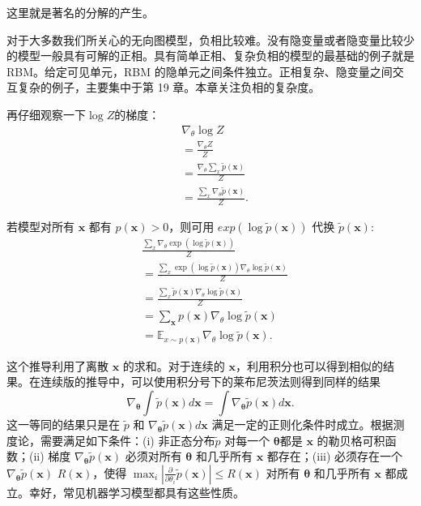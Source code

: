 这里就是著名的分解的产生。

对于大多数我们所关心的无向图模型，负相比较难。没有隐变量或者隐变量比较少的模型一般具有可解的正相。具有简单正相、复杂负相的模型的最基础的例子就是 RBM。给定可见单元，RBM 的隐单元之间条件独立。正相复杂、隐变量之间交互复杂的例子，主要集中于第 19 章。本章关注负相的复杂度。

再仔细观察一下\(\log Z\)的梯度：
\begin{align}
    & \nabla_\theta \log{Z}                                \\
    & = \frac{\nabla_\theta Z}{Z}                          \\
    & = \frac{\nabla_\theta\sum_x\widetilde{p}(\bm{x})}{Z} \\
    & = \frac{\sum_x\nabla_\theta\widetilde{p}(\bm{x})}{Z}.
\end{align}

若模型对所有 \(\bm{x}\) 都有 \(p(\bm{x})>0\)，则可用 \(exp(\log\widetilde{p}(\bm{x}))\) 代换 \(\widetilde{p}(\bm{x})\):
\begin{align}
& \frac{\sum_x\nabla_\theta\exp(
	\log{\widetilde{p}(\bm{x})})}{Z}             \\
& = \frac{\sum_x\exp(\log{\widetilde{p}(\bm{x})})
	\nabla_\theta\log{\widetilde{p}(\bm{x})}}{Z} \\
& = \frac{\sum_x\widetilde{p}(\bm{x})
	\nabla_\theta\log\widetilde{p}(\bm{x})}{Z}   \\
& = \sum_{\bm{x}}p(\bm{x})
	\nabla_\theta\log\widetilde{p}(\bm{x})       \\
& = \mathbb{E}_{x\sim{}p(\bm{x})}
	\nabla_\theta\log\widetilde{p}(\bm{x}).
\end{align}

这个推导利用了离散 \(\bm{x}\) 的求和。对于连续的 \(\bm{x}\)，利用积分也可以得到相似的结果。在连续版的推导中，可以使用积分号下的莱布尼茨法则得到同样的结果
\begin{equation}
    \nabla_{\bm{\theta}}\int\widetilde{p}(\bm{x})d\bm{x}
    = \int\nabla_{\bm\theta}\widetilde{p}(\bm{x})d\bm{x}.
\end{equation}
这一等同的结果只是在 \( \widetilde{p} \) 和 \( \nabla_{\bm\theta}\widetilde{p}(\bm{x})d\bm{x} \) 满足一定的正则化条件时成立。根据测度论，需要满足如下条件：(i) 非正态分布\( \widetilde{p} \) 对每一个 \(\bm{\theta}\)都是 \(\bm{x}\) 的勒贝格可积函数；(ii) 梯度 \( \nabla_{\bm\theta}\widetilde{p}(\bm{x}) \) 必须对所有 \(\bm\theta\) 和几乎所有 \(\bm x\) 都存在；(iii) 必须存在一个 \( \nabla_{\bm\theta}\widetilde{p}(\bm{x}) \)  \(R({\bm x})\)，使得 \(\max_i|\frac{\partial}{\partial \theta_i}\widetilde{p}(\bm{x})| \leq R(\bm{x}) \) 对所有 \(\bm\theta\) 和几乎所有 \(\bm x\) 都成立。幸好，常见机器学习模型都具有这些性质。

